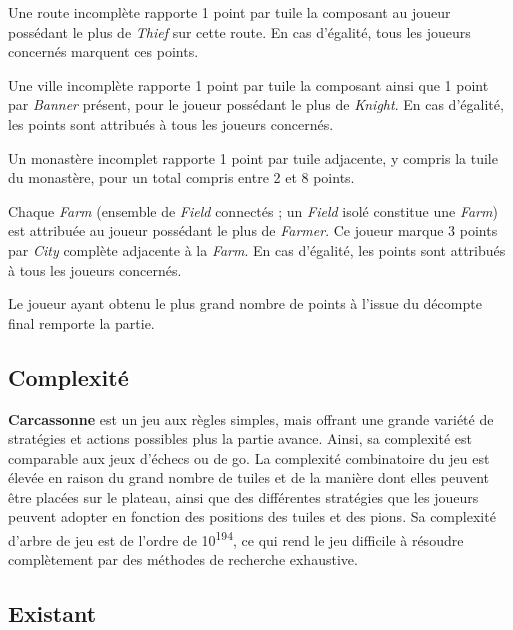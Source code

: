 \documentclass[a4paper]{article}
\begin{document}
\begin{description}[style=nextline]
  \item[Road]
  Une route incomplète rapporte 1 point par tuile la composant au joueur possédant le plus de \textit{Thief} sur cette route.
  En cas d’égalité, tous les joueurs concernés marquent ces points.

  \item[City]
  Une ville incomplète rapporte 1 point par tuile la composant ainsi que 1 point par \textit{Banner} présent,
  pour le joueur possédant le plus de \textit{Knight}.
  En cas d’égalité, les points sont attribués à tous les joueurs concernés.

  \item[Monastery]
  Un monastère incomplet rapporte 1 point par tuile adjacente, y compris la tuile du monastère,
  pour un total compris entre 2 et 8 points.

  \item[Field]
  Chaque \textit{Farm} (ensemble de \textit{Field} connectés ; un \textit{Field} isolé constitue une \textit{Farm})
  est attribuée au joueur possédant le plus de \textit{Farmer}.
  Ce joueur marque 3 points par \textit{City} complète adjacente à la \textit{Farm}.
  En cas d’égalité, les points sont attribués à tous les joueurs concernés.
\end{description}

Le joueur ayant obtenu le plus grand nombre de points à l’issue du décompte final remporte la partie.


\subsection{Complexité}

\textbf{Carcassonne} est un jeu aux règles simples, mais offrant une grande variété de stratégies et actions possibles plus la partie avance.
Ainsi, sa complexité est comparable aux jeux d'échecs ou de go. La complexité combinatoire du jeu est élevée en raison du grand nombre de tuiles et de la manière dont elles peuvent être placées sur le plateau, ainsi que des différentes stratégies que les joueurs peuvent adopter en fonction des positions des tuiles et des pions.
Sa complexité d'arbre de jeu est de l'ordre de 10\textsuperscript{194}\cite{heydencarcassonne}, ce qui rend le jeu difficile à résoudre complètement par des méthodes de recherche exhaustive.
\subsection{Existant}
\end{document}
